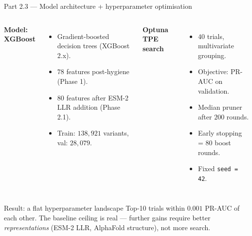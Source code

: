 \documentclass[aspectratio=169,10pt]{beamer}
\begin{document}
\begin{frame}{Part 2.3 --- Model architecture + hyperparameter optimisation}
  \footnotesize
  \begin{columns}[T]
    \textbf{\textcolor{kkuGreen}{Model: XGBoost}}
    \begin{itemize}\setlength{\itemsep}{0.18em}
      \item Gradient-boosted decision trees (XGBoost 2.x).
      \item $78$ features post-hygiene (Phase 1).
      \item $80$ features after ESM-2 LLR addition (Phase 2.1).
      \item Train: $138{,}921$ variants, val: $28{,}079$.
    \end{itemize}

    \textbf{\textcolor{kkuGreen}{Optuna TPE search}}
    \begin{itemize}\setlength{\itemsep}{0.18em}
      \item $40$ trials, multivariate grouping.
      \item Objective: PR-AUC on validation.
      \item Median pruner after $200$ rounds.
      \item Early stopping = $80$ boost rounds.
      \item Fixed \texttt{seed = 42}.
    \end{itemize}
  \end{columns}

  \vspace{0.6em}
  \begin{exampleblock}{Result: a flat hyperparameter landscape}
    Top-10 trials within $0.001$ PR-AUC of each other. The baseline
    ceiling is real --- further gains require better
    \emph{representations} (ESM-2 LLR, AlphaFold structure), not
    more search.
  \end{exampleblock}
\end{frame}
\end{document}
